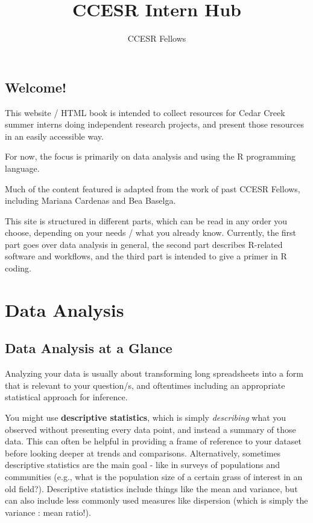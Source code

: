 \documentclass[
  letterpaper,
  DIV=11,
  numbers=noendperiod]{scrreprt}
\title{CCESR Intern Hub}
\author{CCESR Fellows}
\date{}
\renewcommand*\contentsname{Table of contents}
\newcommand\contentsname{Table of contents}
\begin{document}
\maketitle

\renewcommand*\contentsname{Table of contents}
{
\hypersetup{linkcolor=}
\setcounter{tocdepth}{2}
\tableofcontents
}

\chapter*{Welcome!}\label{welcome}


This website / HTML book is intended to collect resources for Cedar
Creek summer interns doing independent research projects, and present
those resources in an easily accessible way.

For now, the focus is primarily on data analysis and using the R
programming language.

Much of the content featured is adapted from the work of past CCESR
Fellows, including Mariana Cardenas and Bea Baselga.

This site is structured in different parts, which can be read in any
order you choose, depending on your needs / what you already know.
Currently, the first part goes over data analysis in general, the second
part describes R-related software and workflows, and the third part is
intended to give a primer in R coding.

\part{Data Analysis}

\chapter{Data Analysis at a Glance}\label{data-analysis-at-a-glance}

Analyzing your data is usually about transforming long spreadsheets into
a form that is relevant to your question/s, and oftentimes including an
appropriate statistical approach for inference.

You might use \textbf{descriptive statistics}, which is simply
\emph{describing} what you observed without presenting every data point,
and instead a summary of those data. This can often be helpful in
providing a frame of reference to your dataset before looking deeper at
trends and comparisons. Alternatively, sometimes descriptive statistics
are the main goal - like in surveys of populations and communities
(e.g., what is the population size of a certain grass of interest in an
old field?). Descriptive statistics include things like the mean and
variance, but can also include less commonly used measures like
dispersion (which is simply the variance : mean ratio!).
\end{document}
